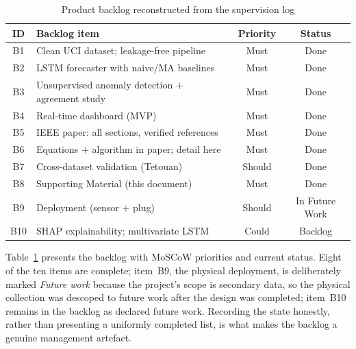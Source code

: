 \documentclass[11pt,a4paper]{article}
\begin{document}
\begin{table}[htbp]
\centering
\caption{Product backlog reconstructed from the supervision log}
\label{tab:backlog}
\small
\renewcommand{\arraystretch}{1.3}
\begin{tabular}{|c|p{7.4cm}|c|c|}
\hline
\textbf{ID} & \textbf{Backlog item} & \textbf{Priority} & \textbf{Status}\\ \hline
B1 & Clean UCI dataset; leakage-free pipeline & Must & Done\\ \hline
B2 & LSTM forecaster with naive/MA baselines & Must & Done\\ \hline
B3 & Unsupervised anomaly detection $+$ agreement study & Must & Done\\ \hline
B4 & Real-time dashboard (MVP) & Must & Done\\ \hline
B5 & IEEE paper: all sections, verified references & Must & Done\\ \hline
B6 & Equations $+$ algorithm in paper; detail here & Must & Done\\ \hline
B7 & Cross-dataset validation (Tetouan) & Should & Done\\ \hline
B8 & Supporting Material (this document) & Must & Done\\ \hline
B9 & Deployment (sensor $+$ plug) & Should & In Future Work\\ \hline
B10 & SHAP explainability; multivariate LSTM & Could & Backlog\\ \hline
\end{tabular}
\end{table}

Table~\ref{tab:backlog} presents the backlog with MoSCoW priorities and current status. Eight of the ten items are complete; item~B9, the physical deployment, is deliberately marked \emph{Future work} because the project's scope is secondary data, so the physical collection was descoped to future work after the design was completed; item~B10 remains in the backlog as declared future work. Recording the state honestly, rather than presenting a uniformly completed list, is what makes the backlog a genuine management artefact.
\end{document}

